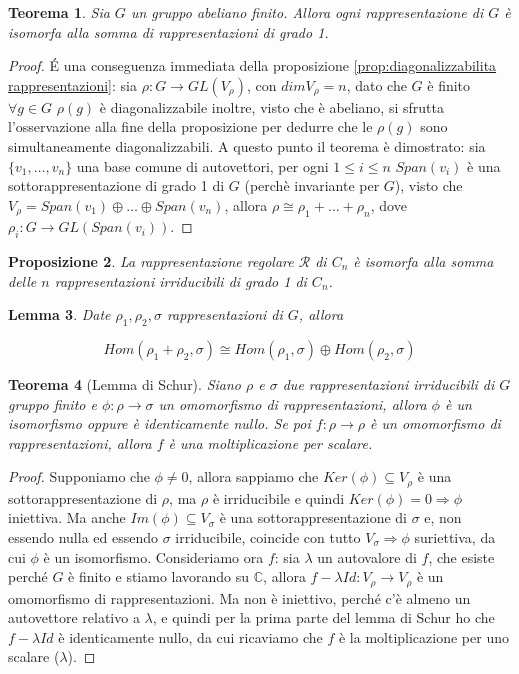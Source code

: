 \documentclass[11pt]{article}
\theoremstyle{plain}
\newtheorem{thm}{Teorema}[section]
\newtheorem{lemma}[thm]{Lemma}
\newtheorem{prop}[thm]{Proposizione}
\theoremstyle{definition}
\theoremstyle{remark}
\newcommand{\C}{\mathbb{C}}
\begin{document}
\begin{thm}Sia $G$ un gruppo abeliano finito. Allora ogni rappresentazione di $G$ è isomorfa alla somma di rappresentazioni di grado 1.
\end{thm}
\begin{proof}
	\'E una conseguenza immediata della proposizione \eqref{prop:diagonalizzabilita rappresentazioni}: sia $\rho:G\to GL(V_{\rho})$, con $dim V_{\rho} = n$, dato che $G$ è finito $\forall g\in G$ $\rho(g)$ è diagonalizzabile inoltre, visto che è abeliano, si sfrutta l'osservazione alla fine della proposizione per dedurre che le $\rho(g)$ sono simultaneamente diagonalizzabili. A questo punto il teorema è dimostrato: sia $\{v_1,\ldots,v_n\}$ una base comune di autovettori, per ogni $1\leq i\leq n$ $Span(v_i)$ è una sottorappresentazione di grado 1 di $G$ (perchè invariante per $G$), visto che $V_{\rho}=Span(v_1)\oplus\ldots\oplus Span(v_n)$, allora $\rho\cong\rho_1+\ldots+\rho_n$, dove $\rho_i:G\to GL(Span(v_i))$.
\end{proof}


\begin{prop} La rappresentazione regolare $\mathcal{R}$ di $C_n$ è isomorfa alla somma delle $n$ rappresentazioni irriducibili di grado 1 di $C_n$.

\end{prop}


\begin{lemma}
Date $\rho_1, \rho_2, \sigma$ rappresentazioni di $G$, allora

\[Hom(\rho_1 + \rho_2, \sigma) \cong Hom(\rho_1, \sigma) \oplus Hom(\rho_2, \sigma)\]

\end{lemma}


\begin{thm}[Lemma di Schur]
Siano $\rho$ e $\sigma$ due rappresentazioni irriducibili di $G$ gruppo finito e $\phi:\rho\to\sigma$ un omomorfismo di rappresentazioni, allora $\phi$ è un isomorfismo oppure è identicamente nullo. Se poi $f:\rho\to\rho$ è un omomorfismo di rappresentazioni, allora $f$ è una moltiplicazione per scalare.
\end{thm}
\begin{proof}
Supponiamo che $\phi\neq0$, allora sappiamo che $Ker(\phi)\subseteq V_\rho$ è una sottorappresentazione di $\rho$, ma $\rho$ è irriducibile e quindi $Ker(\phi)=0\Rightarrow \phi$ iniettiva. Ma anche $Im(\phi)\subseteq V_{\sigma}$ è una sottorappresentazione di $\sigma$ e, non essendo nulla ed essendo $\sigma$ irriducibile, coincide con tutto $V_\sigma \Rightarrow \phi$ suriettiva, da cui $\phi$ è un isomorfismo.
Consideriamo ora $f$: sia $\lambda$ un autovalore di $f$, che esiste perché $G$ è finito e stiamo lavorando su $\C$, allora $f-\lambda Id:V_\rho\to V_\rho$ è un omomorfismo di rappresentazioni. Ma non è iniettivo, perché c'è almeno un autovettore relativo a $\lambda$, e quindi per la prima parte del lemma di Schur ho che $f-\lambda Id$ è identicamente nullo, da cui ricaviamo che $f$ è la moltiplicazione per uno scalare ($\lambda$).
\end{proof}
\end{document}
